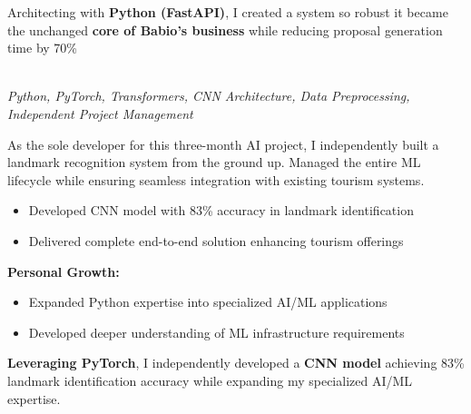 \documentclass[a4paper,10pt]{article}
\newcommand{\experiencebreak}{\needspace{18\baselineskip}}
\begin{document}
\vspace{0.4cm}

Architecting with \textbf{Python (FastAPI)}, I created a system so robust it became the
unchanged \textbf{core of Babio's business} while reducing proposal generation time by
70\%

\vspace{0.4cm}

\experiencebreak
\noindent\uline{} \\
\vspace{0.1cm} \hspace{0.2cm}
{\small\textit{Python, PyTorch, Transformers, CNN Architecture, Data Preprocessing, Independent Project Management}}

As the sole developer for this three-month AI project, I independently built a landmark recognition system from the ground up. Managed the entire ML lifecycle while ensuring seamless integration with existing tourism systems.

\vspace{0.2cm}
\begin{itemize}[label=\textcolor{darkblue}{\textbullet}, leftmargin=*, nosep]
	\item Developed CNN model with 83\% accuracy in landmark identification
	\item Delivered complete end-to-end solution enhancing tourism offerings
\end{itemize}

\vspace{0.2cm}
\textbf{Personal Growth:}
\vspace{0.2cm}
\begin{itemize}[label=\textcolor{darkblue}{\textbullet}, leftmargin=*, nosep]
	\item Expanded Python expertise into specialized AI/ML applications
	\item Developed deeper understanding of ML infrastructure requirements
\end{itemize}

\vspace{0.4cm}

\textbf{Leveraging PyTorch}, I independently developed a \textbf{CNN model} achieving 83\% landmark identification accuracy while expanding my specialized AI/ML expertise.

\vspace{0.4cm}
\end{document}
